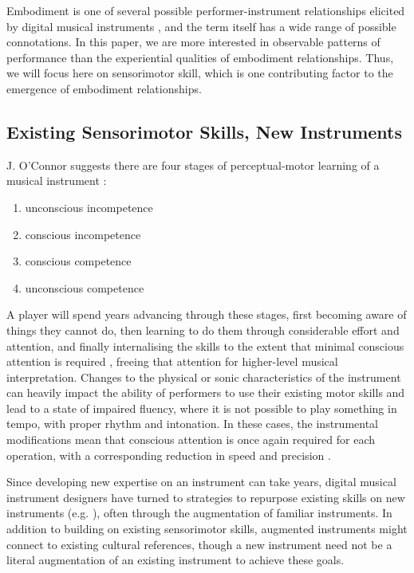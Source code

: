 \documentclass[sigconf]{nimeart}
\begin{document}
Embodiment is one of several possible performer-instrument relationships elicited by digital musical instruments \cite{magnusson2009epistemic,tahirouglu2020digital}, and the term itself has a wide range of possible connotations. In this paper, we are more interested in observable patterns of performance than the experiential qualities of embodiment relationships. Thus, we will focus here on sensorimotor skill, which is one contributing factor to the emergence of embodiment relationships.

\subsection{Existing Sensorimotor Skills, New Instruments}\label{existing-sensorimotor-skills-new-instruments}

J. O'Connor suggests there are four stages of perceptual-motor learning of a musical instrument \cite{norton1989not}:

\begin{enumerate}
\item
  unconscious incompetence
\item
  conscious incompetence
\item
  conscious competence
\item
  unconscious competence
\end{enumerate}

A player will spend years advancing through these stages, first becoming aware of things they cannot do, then learning to do them through considerable effort and attention, and finally internalising the skills to the extent that minimal conscious attention is required \cite{leman2010user,schmidt2018motor}, freeing that attention for higher-level musical interpretation. Changes to the physical or sonic characteristics of the instrument can heavily impact the ability of performers to use their existing motor skills \cite{morreale2018effect} and lead to a state of impaired fluency, where it is not possible to play something in tempo, with proper rhythm and intonation. In these cases, the instrumental modifications mean that conscious attention is once again required for each operation, with a corresponding reduction in speed and precision \cite{guidi2020design}.

Since developing new expertise on an instrument can take years, digital musical instrument designers have turned to strategies to repurpose existing skills on new instruments (e.g. \cite{overholt2005overtone,McPherson_2017,thibodeau2013trumpet}), often through the augmentation of familiar instruments. In addition to building on existing sensorimotor skills, augmented instruments might connect to existing cultural references, though a new instrument need not be a literal augmentation of an existing instrument to achieve these goals.
\end{document}

